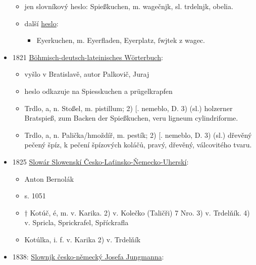 \begin{itemize}
  \begin{itemize}
  \tightlist
  \item
    jen slovníkový heslo: Spießkuchen, m. wagečnjk, sl. trdelnjk,
    obelia.
  \item
    další
    \href{https://bara.ujc.cas.cz/slovniky/dobrovsky/dobrovsky195.html}{heslo}:

    \begin{itemize}
    \tightlist
    \item
      Eyerkuchen, m. Eyerfladen, Eyerplatz, ſwjtek z wagec.
    \end{itemize}
  \end{itemize}
\item
  1821
  \href{https://ndk.cz/view/uuid:46b33740-ac9f-11dc-bcf0-000d606f5dc6?page=uuid\%3A52eb1c50-0ecb-11e8-bdb0-005056827e51&fulltext=trdelnjk}{Böhmisch-deutsch-lateinisches
  Wörterbuch}:

  \begin{itemize}
  \tightlist
  \item
    vyšlo v Bratislavě, autor Palkovič, Juraj
  \item
    heslo odkazuje na Spiesskuchen a prügelkrapfen
  \item
    Trdlo, a, n. Stoßel, m. pistillum; 2) {[}. nemeblo, D. 3) (sl.)
    holzerner Bratspieß, zum Backen der Spießkuchen, veru ligneum
    cylindriforme.
  \item
    Trdlo, a, n. Palička/hmoždíř, m. pestík; 2) {[}. nemeblo, D. 3)
    (sl.) dřevěný pečený špíz, k pečení špízových koláčů, pravý,
    dřevěný, válcovitého tvaru.
  \end{itemize}
\item
  1825
  \href{https://www.google.cz/books/edition/Slow\%C3\%A1r_Slowensk\%C3\%AD_\%C4\%8Cesko_La\%C5\%A5insko_\%C5\%87em/Sd1bAAAAcAAJ?hl=cs&gbpv=1&dq=trdeln\%C3\%ADk&pg=PA1051&printsec=frontcover}{Slowár
  Slowenskí Česko-Laťinsko-Ňemecko-Uherskí}:

  \begin{itemize}
  \tightlist
  \item
    Anton Bernolák
  \item
    s. 1051
  \item
    † Kotúč, é, m. v. Karika. 2) v. Kolečko (Taličři) 7 Nro. 3) v.
    Trdelňík. 4) v. Spricla, Sprickrafel, Spříckrafla
  \item
    Kotúlka, i. f. v. Karika 2) v. Trdelňík
  \end{itemize}
\item
  1838:
  \href{https://ndk.cz/uuid/uuid:b6d79670-8232-11dc-abad-000d606f5dc6}{Slownjk
  česko-německý Josefa Jungmanna}:


\end{itemize}
